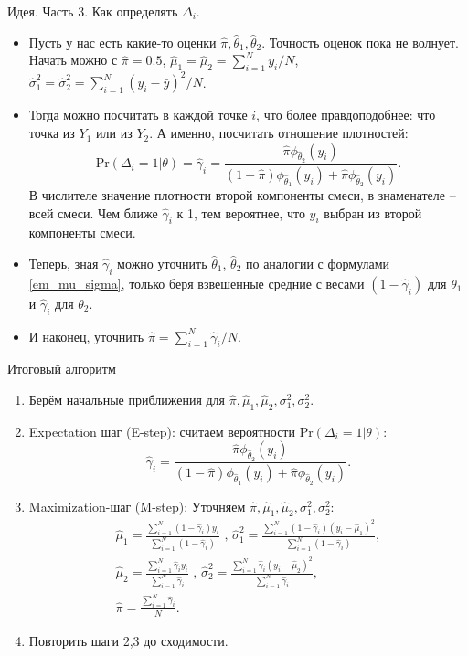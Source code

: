 \documentclass[9pt]{beamer}
\begin{document}
\begin{frame}{Идея. Часть 3. Как определять $\Delta_i$.}
    \begin{itemize}
        \item Пусть у нас есть какие-то оценки $\hat\pi, \hat\theta_1, \hat\theta_2$. Точность оценок пока не волнует. Начать можно с $\hat\pi = 0.5$, $\hat\mu_1 = \hat\mu_2 = \sum_{i=1}^N y_i/N$, $ \hat\sigma_1^2=\hat\sigma_2^2=\sum_{i=1}^N (y_i - \bar y)^2/N$.
        \item Тогда можно посчитать в каждой точке $i$, что более правдоподобнее: что точка из $Y_1$ или из $Y_2$. А именно, посчитать отношение плотностей:
        $$\text{Pr}(\Delta_i=1|\theta) = \hat\gamma_i = \frac{\hat\pi \phi_{\hat\theta_2}(y_i)}{(1-\hat\pi) \phi_{\hat\theta_1}(y_i) + \hat\pi \phi_{\hat\theta_2}(y_i)}.$$
        В числителе значение плотности второй компоненты смеси, в знаменателе -- всей смеси. Чем ближе $\hat\gamma_i$ к 1, тем вероятнее, что $y_i$ выбран из второй компоненты смеси.
        \item Теперь, зная $\hat\gamma_i$ можно уточнить $\hat\theta_1$, $\hat\theta_2$ по аналогии с формулами \eqref{em_mu_sigma}, только беря взвешенные средние с весами $(1-\hat\gamma_i)$ для $\theta_1$ и $\hat\gamma_i$ для $\theta_2$.
        \item И наконец, уточнить $\hat\pi = \sum_{i=1}^N\hat\gamma_i/N$.
    \end{itemize}
\end{frame}

\begin{frame}{Итоговый алгоритм}
    \begin{enumerate}
        \item Берём начальные приближения для $\hat\pi, \hat\mu_1, \hat\mu_2, \sigma_1^2, \sigma_2^2$.
        \item Expectation шаг (E-step): считаем вероятности $\text{Pr}(\Delta_i=1|\theta)$:
        $$\hat\gamma_i = \frac{\hat\pi \phi_{\hat\theta_2}(y_i)}{(1-\hat\pi) \phi_{\hat\theta_1}(y_i) + \hat\pi \phi_{\hat\theta_2}(y_i)}.$$
        \item Maximization-шаг (M-step): Уточняем $\hat\pi, \hat\mu_1, \hat\mu_2, \sigma_1^2, \sigma_2^2$:
        \begin{gather*}
        \hat\mu_1 = \frac{\sum\limits_{i=1}^N (1-\hat\gamma_i)y_i}{\sum\limits_{i=1}^N (1-\hat\gamma_i)}  \text{  ,  } \hat\sigma_1^2 = \frac{\sum\limits_{i=1}^N (1-\hat\gamma_i)(y_i - \hat\mu_1)^2}{\sum\limits_{i=1}^N (1-\hat\gamma_i)},\\
        \hat\mu_2 = \frac{\sum\limits_{i=1}^N \hat\gamma_i y_i}{\sum\limits_{i=1}^N \hat\gamma_i}  \text{  ,  } \hat\sigma_2^2 = \frac{\sum\limits_{i=1}^N \hat\gamma_i(y_i - \hat\mu_2)^2}{\sum\limits_{i=1}^N \hat\gamma_i},\\
        \hat\pi = \frac{\sum\limits_{i=1}^N \hat\gamma_i}{N}.
        \end{gather*}
        \item Повторить шаги 2,3 до сходимости.
    \end{enumerate}
\end{frame}
\end{document}
